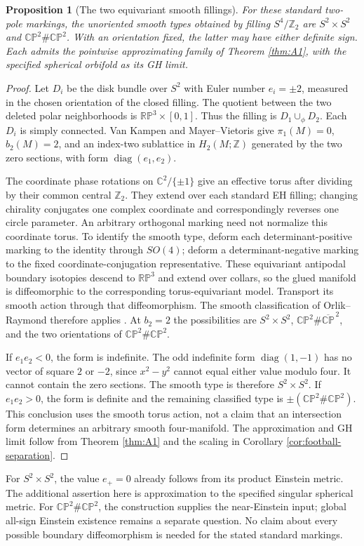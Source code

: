\documentclass[a4paper,11pt]{article}
\numberwithin{equation}{section}
\newtheorem{proposition}[theorem]{Proposition}
\theoremstyle{definition}
\newcommand{\CP}{\mathbb{CP}}
\begin{document}
\begin{proposition}[The two equivariant smooth fillings]\label{prop:two-pole-fillings}
For these standard two-pole markings, the unoriented smooth types obtained by filling $S^4/\mathbb Z_2$ are $S^2\times S^2$ and $\CP^2\#\CP^2$. With an orientation fixed, the latter may have either definite sign. Each admits the pointwise approximating family of Theorem \ref{thm:A1}, with the specified spherical orbifold as its GH limit.
\end{proposition}
\begin{proof}
Let $D_i$ be the disk bundle over $S^2$ with Euler number $e_i=\pm2$, measured in the chosen orientation of the closed filling. The quotient between the two deleted polar neighborhoods is $\mathbb{RP}^3\times[0,1]$. Thus the filling is $D_1\cup_\phi D_2$. Each $D_i$ is simply connected. Van Kampen and Mayer--Vietoris give $\pi_1(M)=0$, $b_2(M)=2$, and an index-two sublattice in $H_2(M;\mathbb Z)$ generated by the two zero sections, with form $\operatorname{diag}(e_1,e_2)$.

The coordinate phase rotations on $\mathbb C^2/\{\pm1\}$ give an effective torus after dividing by their common central $\mathbb Z_2$. They extend over each standard EH filling; changing chirality conjugates one complex coordinate and correspondingly reverses one circle parameter. An arbitrary orthogonal marking need not normalize this coordinate torus. To identify the smooth type, deform each determinant-positive marking to the identity through $SO(4)$; deform a determinant-negative marking to the fixed coordinate-conjugation representative. These equivariant antipodal boundary isotopies descend to $\mathbb{RP}^3$ and extend over collars, so the glued manifold is diffeomorphic to the corresponding torus-equivariant model. Transport its smooth action through that diffeomorphism. The smooth classification of Orlik--Raymond therefore applies \cite[\S5]{OrlikRaymond}. At $b_2=2$ the possibilities are $S^2\times S^2$, $\CP^2\#\overline{\CP}^{\,2}$, and the two orientations of $\CP^2\#\CP^2$.

If $e_1e_2<0$, the form is indefinite. The odd indefinite form $\operatorname{diag}(1,-1)$ has no vector of square $2$ or $-2$, since $x^2-y^2$ cannot equal either value modulo four. It cannot contain the zero sections. The smooth type is therefore $S^2\times S^2$. If $e_1e_2>0$, the form is definite and the remaining classified type is $\pm(\CP^2\#\CP^2)$. This conclusion uses the smooth torus action, not a claim that an intersection form determines an arbitrary smooth four-manifold. The approximation and GH limit follow from Theorem \ref{thm:A1} and the scaling in Corollary \ref{cor:football-separation}.
\end{proof}
For $S^2\times S^2$, the value $e_+=0$ already follows from its product Einstein metric. The additional assertion here is approximation to the specified singular spherical metric. For $\CP^2\#\CP^2$, the construction supplies the near-Einstein input; global all-sign Einstein existence remains a separate question. No claim about every possible boundary diffeomorphism is needed for the stated standard markings.
\end{document}

